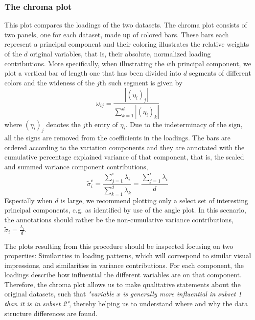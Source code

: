 \documentclass[titlepage,11pt,twoside]{article}
\begin{document}
\subsubsection{The chroma plot}
This plot compares the loadings of the two datasets. The chroma plot consists of two panels, one for each dataset, made up of colored bars. These bars each represent a principal component and their coloring illustrates the relative weights of the $d$ original variables, that is, their absolute, normalized loading contributions. More specifically, when illustrating the $i$th principal component, we plot a vertical bar of length one that has been divided into $d$ segments of different colors and the wideness of the $j$th such segment is given by
$$\omega_{ij} = \frac{|(\eta_i)_j|}{\sum_{k=1}^d |(\eta_i)_k|}$$
where $(\eta_i)_j$ denotes the $j$th entry of $\eta_i$. Due to the indeterminacy of the sign, all the signs are removed from the coefficients in the loadings. The bars are ordered according to the variation components and they are annotated with the cumulative percentage explained variance of that component, that is, the scaled and summed variance component contributions,
$$\tilde\sigma^c_i = \frac{\sum_{j = 1}^i \lambda_i}{\sum_{k=1}^d \lambda_k} = \frac{\sum_{j = 1}^i \lambda_i}{d}$$
Especially when $d$ is large, we recommend plotting only a select set of interesting principal components, e.g. as identified by use of the angle plot. In this scenario, the annotations should rather be the non-cumulative variance contributions, $\tilde\sigma_i = \frac{\lambda_i}{d}$.

The plots resulting from this procedure should be inspected focusing on two properties: Similarities in loading patterns, which will correspond to similar visual impressions, and similarities in variance contributions. For each component, the loadings describe how influential the different variables are on that component. Therefore, the chroma plot allows us to make qualitative statements about the original datasets, such that \textit{"variable $x$ is generally more influential in subset 1 than it is in subset 2"}, thereby helping us to understand where and why the data structure differences are found.
\end{document}
